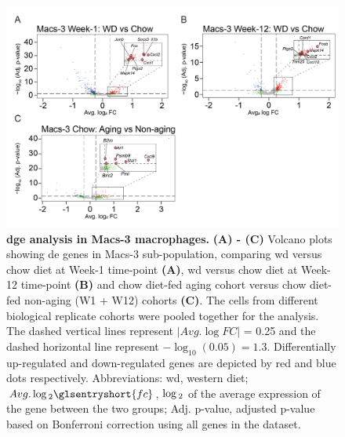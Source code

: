 \begin{figure}[t]
\centering
\includegraphics[width=\linewidth]{Chapter4/Fig/F2-11-01.png}
\caption[ analysis in Macs-3 macrophages]{\textbf{\gls{dge} analysis in Macs-3 macrophages.} \textbf{(A) - (C)} Volcano plots showing \gls{de} genes in Macs-3 sub-population, comparing \gls{wd} versus chow diet at Week-1 time-point \textbf{(A)}, \gls{wd} versus chow diet at Week-12 time-point \textbf{(B)} and chow diet-fed aging cohort versus chow diet-fed non-aging (W1 + W12) cohorts \textbf{(C)}.  The cells from different biological replicate cohorts were pooled together for the analysis. The dashed vertical lines represent $  \left|Avg. \log FC \right| $ = 0.25 and the dashed horizontal line represent $-\log_{10}(\num{0.05}) = 1.3$. Differentially up-regulated and down-regulated genes are depicted by red and blue dots respectively. Abbreviations: \gls{wd}, western diet; $Avg. \log\textsubscript{2} \glsentryshort{fc}$, $\log\textsubscript{2}$  of the average expression of the gene between the two groups; Adj. p-value, adjusted p-value based on Bonferroni correction using all genes in the dataset.}
\label{fig:chp2_scrna_macrophages_macs3_dge}
\end{figure}

